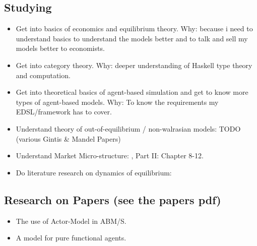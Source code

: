 \documentclass{article}
\begin{document}
\subsection{Studying}
\begin{itemize}
\item Get into basics of economics and equilibrium theory. Why: because i need to understand basics to understand the models better and to talk and sell my models better to economists.
\item Get into category theory. Why: deeper understanding of Haskell type theory and computation.
\item Get into theoretical basics of agent-based simulation and get to know more types of agent-based models. Why: To know the requirements my EDSL/framework has to cover.
\item Understand theory of out-of-equilibrium / non-walrasian models: TODO (various Gintis \& Mandel Papers)
\item Understand Market Micro-structure: \cite{LehalleLaruelle2013}, \cite{baker_market_2013} Part II: Chapter 8-12.
\item Do literature research on dynamics of equilibrium: \cite{emergent_2008}
\end{itemize}

\subsection{Research on Papers (see the papers pdf)}
\begin{itemize}
\item The use of Actor-Model in ABM/S.
\item A model for pure functional agents.
\end{itemize}





\end{document}
